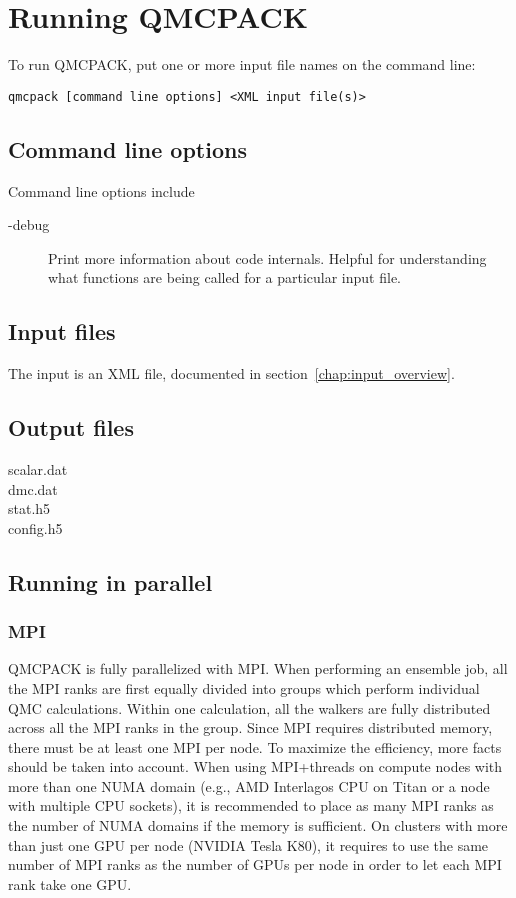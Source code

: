 \chapter{Running QMCPACK}
\label{chap:running}

To run QMCPACK, put one or more input file names on the command line:
\begin{verbatim}
qmcpack [command line options] <XML input file(s)>
\end{verbatim}

\section{Command line options}
\label{sec:commandline}
Command line options include

\begin{description}
\item[-debug]{ Print more information about code internals.  Helpful for understanding what functions are being called for a particular input file.}
\end{description}




\section{Input files}
\label{sec:inputs}
The input is an XML file, documented in section~\ref{chap:input_overview}.

\section{Output files}
\label{sec:outputs}

  scalar.dat\\
  dmc.dat\\
  stat.h5\\
  config.h5

\section{Running in parallel}
\label{sec:parallelrunning}


\subsection{MPI}
QMCPACK is fully parallelized with MPI. When performing an ensemble job, all the MPI ranks are first equally divided into groups which perform individual QMC calculations. Within one calculation, all the walkers are fully distributed across all the MPI ranks in the group. Since MPI requires distributed memory, there must be at least one MPI per node. To maximize the efficiency, more facts should be taken into account. When using MPI+threads on compute nodes with more than one NUMA domain (e.g., AMD Interlagos CPU on Titan or a node with multiple CPU sockets), it is recommended to place as many MPI ranks as the number of NUMA domains if the memory is sufficient. On clusters with more than just one GPU per node (NVIDIA Tesla K80), it requires to use the same number of MPI ranks as the number of GPUs per node in order to let each MPI rank take one GPU.


